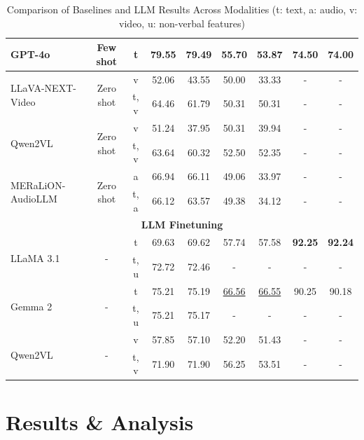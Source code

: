 \begin{table}[h!]
\begin{tabular}{l c c cc cc cc}
\midrule
GPT-4o    & Few shot & t & 79.55 & 79.49 & 55.70 & 53.87 & 74.50 & 74.00 \\
\midrule
\multirow{2}{*}{LLaVA-NEXT-Video} & \multirow{2}{*}{Zero shot} & v     & 52.06 & 43.55 & 50.00 & 33.33 & - & - \\
&  & t, v  & 64.46 & 61.79 & 50.31 & 50.31 & - & - \\
\midrule
\multirow{2}{*}{Qwen2VL}          & \multirow{2}{*}{Zero shot} & v & 51.24 & 37.95 & 50.31 & 39.94 & - & - \\
&  & t, v  & 63.64 & 60.32 & 52.50 & 52.35 & - & - \\
\midrule
\multirow{2}{*}{MERaLiON-AudioLLM}& \multirow{2}{*}{Zero shot} & a     & 66.94 & 66.11 & 49.06 & 33.97 & - & - \\
&  & t, a  & 66.12 & 63.57 & 49.38 & 34.12 & - & - \\
\midrule
\multicolumn{9}{c}{\textbf{LLM Finetuning}} \\
\midrule
\multirow{2}{*}{LLaMA 3.1} & \multirow{2}{*}{-} & t & 69.63 & 69.62 & 57.74 & 57.58 & \textbf{92.25} & \textbf{92.24} \\
&                          & t, u   & 72.72 & 72.46 & - & - & - & - \\
\midrule
\multirow{2}{*}{Gemma 2}   & \multirow{2}{*}{-} & t     & 75.21 & 75.19 & \underline{66.56} & \underline{66.55} & 90.25 & 90.18 \\
&                          & t, u   & 75.21 & 75.17 & - & - & - & - \\
\midrule
\multirow{2}{*}{Qwen2VL}   & \multirow{2}{*}{-} & v     & 57.85 & 57.10 & 52.20 & 51.43 & - & - \\
&                          & t, v   & 71.90 & 71.90 & 56.25 & 53.51 & - & - \\
\bottomrule
\end{tabular}

\caption{Comparison of Baselines and LLM Results Across Modalities (t: text, a: audio, v: video, u: non-verbal features)}

\label{tab:myresults}
\end{table}



\section{Results \& Analysis}


